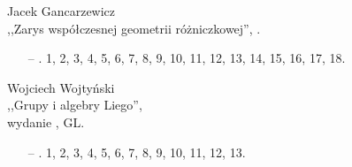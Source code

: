\documentclass[a4paper,11pt]{article}
\begin{document}
\begin{center}
Jacek Gancarzewicz\\
,,Zarys współczesnej geometrii różniczkowej'', \cite{JGZWGR}.
\end{center}
\begin{itemize}
\item[--] . 1, 2, 3, 4, 5, 6, 7, 8, 9, 10, 11, 12, 13, 14, 15, 16, 17, 18.
\end{itemize}



\begin{center}
Wojciech Wojtyński\\
,,Grupy i algebry Liego'',\\ wydanie , GL.
\end{center}
\begin{itemize}
\item[--] . 1, 2, 3, 4, 5, 6, 7, 8, 9, 10, 11, 12, 13.\\
\end{itemize}




{}
\end{document}
